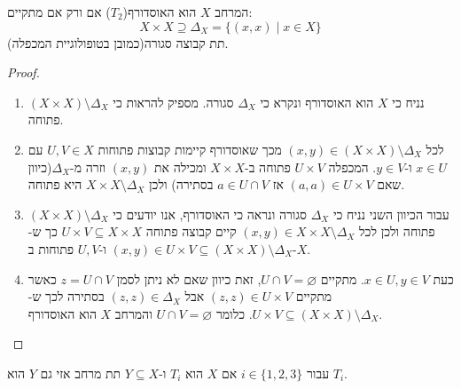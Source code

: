 \documentclass{tstextbook}
\begin{document}
\begin{proposition}
המרחב \(X\) הוא האוסדורף(\(T_{2}\)) אם ורק אם מתקיים:
$$X\times X\supseteq \Delta_{X}=\{ (x,x)\mid x \in X \}$$
תת קבוצה סגורה(כמובן בטופולוגיית המכפלה).

\end{proposition}
\begin{proof}
  \begin{enumerate}
    \item נניח כי \(X\) הוא האוסדורף ונקרא כי \(\Delta_{X}\) סגורה. מספיק להראות כי \((X\times X)\setminus \Delta_{X}\) פתוחה.  


    \item לכל \((x,y)\in (X\times X)\setminus \Delta_{X}\) מכך שאוסדורף קיימות קבוצות פתוחות \(U,V \in X\) עם \(x \in U\) ו-\(y \in V\). המכפלה \(U\times V\) פתוחה ב-\(X \times X\) ומכילה את \((x,y)\) וזרה מ-\(\Delta _X\)(כיוון שאם \((a,a)\in U\times V\) אז \(a \in U \cap V\) בסתירה) ולכן \(X \times X \setminus \Delta _X\) היא פתוחה. 


    \item עבור הכיוון השני נניח כי \(\Delta_X\) סגורה ונראה כי האוסדורף, אנו יודעים כי \((X\times X)\setminus \Delta_{X}\) פתוחה ולכן לכל \((x,y )\in X\times X \setminus \Delta_{X}\) קיים קבוצה פתוחה \(U \times V \subseteq X \times X\) כך ש-\((x,y)\in U \times V\subseteq(X \times X)\setminus \Delta_{X}\) ו-\(U,V\) פתוחות ב-\(X\). 


    \item כעת \(x \in U,y \in V\). מתקיים \(U\cap V=\varnothing\), זאת כיוון שאם לא ניתן לסמן \(z = U \cap V\) כאשר מתקיים \((z,z )\in U\times V\) אבל \((z,z)\in \Delta _X\) בסתירה לכך ש-\(U\times V\subseteq (X\times X)\setminus \Delta_{X}\). כלומר \(U\cap V=\varnothing\) והמרחב \(X\) הוא האוסדורף. 


  \end{enumerate}
\end{proof}
\begin{proposition}
עבור \(i \in \{ 1,2,3 \}\) אם \(X\) הוא \(T_{i}\) ו-\(Y\subseteq X\) תת מרחב אזי גם \(Y\) הוא \(T_{i}\).

\end{proposition}
\end{document}
